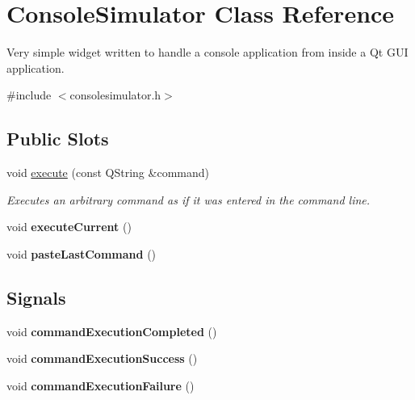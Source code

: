 \hypertarget{class_console_simulator}{\section{\-Console\-Simulator \-Class \-Reference}
\label{class_console_simulator}
}


\-Very simple widget written to handle a console application from inside a \-Qt \-G\-U\-I application.  




{\ttfamily \#include $<$consolesimulator.\-h$>$}

\subsection*{\-Public \-Slots}
\begin{DoxyCompactItemize}
\item 
void \hyperlink{class_console_simulator_a9f7048bf896b66779f1b5f5e45c3a5e3}{execute} (const \-Q\-String \&command)
\begin{DoxyCompactList}\small\item\em \-Executes an arbitrary command as if it was entered in the command line. \end{DoxyCompactList}\item 
\hypertarget{class_console_simulator_ae758ad0513e5a9730869f26b114a29f9}{void {\bfseries execute\-Current} ()}\label{class_console_simulator_ae758ad0513e5a9730869f26b114a29f9}

\item 
\hypertarget{class_console_simulator_a184d8311a882aa0ebb5ebb95dae744af}{void {\bfseries paste\-Last\-Command} ()}\label{class_console_simulator_a184d8311a882aa0ebb5ebb95dae744af}

\end{DoxyCompactItemize}
\subsection*{\-Signals}
\begin{DoxyCompactItemize}
\item 
\hypertarget{class_console_simulator_a14763cf9a480dfe581f0cae155394081}{void {\bfseries command\-Execution\-Completed} ()}\label{class_console_simulator_a14763cf9a480dfe581f0cae155394081}

\item 
\hypertarget{class_console_simulator_a52cb0cbf7172fc4150fb914e366aea91}{void {\bfseries command\-Execution\-Success} ()}\label{class_console_simulator_a52cb0cbf7172fc4150fb914e366aea91}

\item 
\hypertarget{class_console_simulator_a4ebf18a5cae15cacc9eaeb9cff48ffe3}{void {\bfseries command\-Execution\-Failure} ()}\label{class_console_simulator_a4ebf18a5cae15cacc9eaeb9cff48ffe3}

\end{DoxyCompactItemize}

